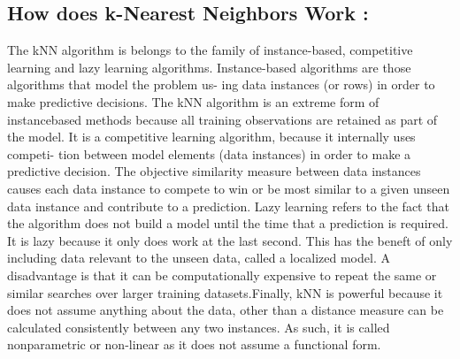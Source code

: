 \documentclass{article}
\begin{document}
	\subsection{How does k-Nearest Neighbors Work :}
	The kNN algorithm is belongs to the family of instance-based, competitive
	learning and lazy learning algorithms.
	Instance-based algorithms are those algorithms that model the problem us-
	ing data instances (or rows) in order to make predictive decisions. The kNN algorithm is an extreme form of instancebased methods because all training
	observations are retained as part of the model.
	It is a competitive learning algorithm, because it internally uses competi-
	tion between model elements (data instances) in order to make a predictive
	decision. The objective similarity measure between data instances causes
	each data instance to compete to win or be most similar to a given unseen
	data instance and contribute to a prediction.
	Lazy learning refers to the fact that the algorithm does not build a model
	until the time that a prediction is required. It is lazy because it only does
	work at the last second. This has the beneft of only including data relevant
	to the unseen data, called a localized model. A disadvantage is that it can be
	computationally expensive to repeat the same or similar searches over larger
	training datasets.Finally, kNN is powerful because it does not assume anything about the
	data, other than a distance measure can be calculated consistently between
	any two instances. As such, it is called nonparametric or non-linear as it
	does not assume a functional form.
	
\end{document}
